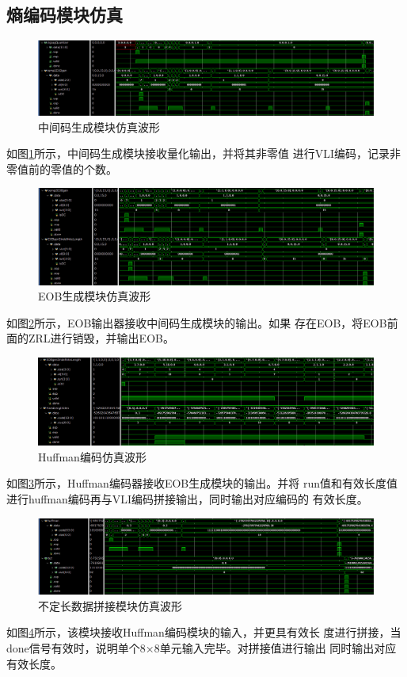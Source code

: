 \documentclass{article}
\numberwithin {equation}{section}
\begin{document}
\begin{spacing}{1.25}
  \subsection{熵编码模块仿真}
    \vspace{1em}
    \begin{figure}[H]
      \centering
      \includegraphics[scale=0.25]{./pictures/temp_wave.png}
      \caption{中间码生成模块仿真波形}
      \label{temp wave}
    \end{figure}
    如图\ref{temp wave}所示，中间码生成模块接收量化输出，并将其非零值
    进行VLI编码，记录非零值前的零值的个数。
    \begin{figure}[H]
      \centering
      \includegraphics[scale=0.25]{./pictures/EOBGen_wave.png}
      \caption{EOB生成模块仿真波形}
      \label{EOBGen wave}
    \end{figure}
    如图\ref{EOBGen wave}所示，EOB输出器接收中间码生成模块的输出。如果
    存在EOB，将EOB前面的ZRL进行销毁，并输出EOB。
    \begin{figure}[H]
      \centering
      \includegraphics[scale=0.25]{./pictures/Huffman_wave.png}
      \caption{Huffman编码仿真波形}
      \label{Huffman wave}
    \end{figure}
    如图\ref{Huffman wave}所示，Huffman编码器接收EOB生成模块的输出。并将
    run值和有效长度值进行huffman编码再与VLI编码拼接输出，同时输出对应编码的
    有效长度。
    \begin{figure}[H]
      \centering
      \includegraphics[scale=0.25]{./pictures/splice_wave.png}
      \caption{不定长数据拼接模块仿真波形}
      \label{splice wave}
    \end{figure}
    如图\ref{splice wave}所示，该模块接收Huffman编码模块的输入，并更具有效长
    度进行拼接，当done信号有效时，说明单个8×8单元输入完毕。对拼接值进行输出
    同时输出对应有效长度。
\newpage

\end{spacing}
\end{document}
